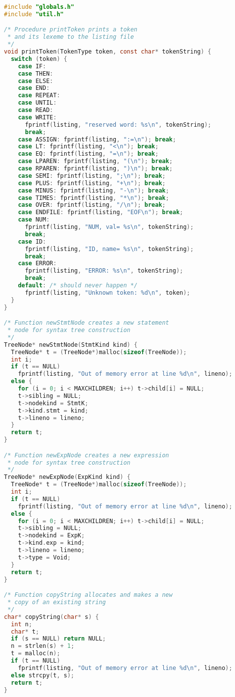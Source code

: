 \documentclass[lang=cn,10pt]{elegantbook}
\begin{document}
\begin{lstlisting}[caption={util.c},language=c]
#include "globals.h"
#include "util.h"

/* Procedure printToken prints a token 
 * and its lexeme to the listing file
 */
void printToken(TokenType token, const char* tokenString) {
  switch (token) {
    case IF:
    case THEN:
    case ELSE:
    case END:
    case REPEAT:
    case UNTIL:
    case READ:
    case WRITE:
      fprintf(listing, "reserved word: %s\n", tokenString);
      break;
    case ASSIGN: fprintf(listing, ":=\n"); break;
    case LT: fprintf(listing, "<\n"); break;
    case EQ: fprintf(listing, "=\n"); break;
    case LPAREN: fprintf(listing, "(\n"); break;
    case RPAREN: fprintf(listing, ")\n"); break;
    case SEMI: fprintf(listing, ";\n"); break;
    case PLUS: fprintf(listing, "+\n"); break;
    case MINUS: fprintf(listing, "-\n"); break;
    case TIMES: fprintf(listing, "*\n"); break;
    case OVER: fprintf(listing, "/\n"); break;
    case ENDFILE: fprintf(listing, "EOF\n"); break;
    case NUM:
      fprintf(listing, "NUM, val= %s\n", tokenString);
      break;
    case ID:
      fprintf(listing, "ID, name= %s\n", tokenString);
      break;
    case ERROR:
      fprintf(listing, "ERROR: %s\n", tokenString);
      break;
    default: /* should never happen */
      fprintf(listing, "Unknown token: %d\n", token);
  }
}

/* Function newStmtNode creates a new statement
 * node for syntax tree construction
 */
TreeNode* newStmtNode(StmtKind kind) {
  TreeNode* t = (TreeNode*)malloc(sizeof(TreeNode));
  int i;
  if (t == NULL)
    fprintf(listing, "Out of memory error at line %d\n", lineno);
  else {
    for (i = 0; i < MAXCHILDREN; i++) t->child[i] = NULL;
    t->sibling = NULL;
    t->nodekind = StmtK;
    t->kind.stmt = kind;
    t->lineno = lineno;
  }
  return t;
}

/* Function newExpNode creates a new expression 
 * node for syntax tree construction
 */
TreeNode* newExpNode(ExpKind kind) {
  TreeNode* t = (TreeNode*)malloc(sizeof(TreeNode));
  int i;
  if (t == NULL)
    fprintf(listing, "Out of memory error at line %d\n", lineno);
  else {
    for (i = 0; i < MAXCHILDREN; i++) t->child[i] = NULL;
    t->sibling = NULL;
    t->nodekind = ExpK;
    t->kind.exp = kind;
    t->lineno = lineno;
    t->type = Void;
  }
  return t;
}

/* Function copyString allocates and makes a new
 * copy of an existing string
 */
char* copyString(char* s) {
  int n;
  char* t;
  if (s == NULL) return NULL;
  n = strlen(s) + 1;
  t = malloc(n);
  if (t == NULL)
    fprintf(listing, "Out of memory error at line %d\n", lineno);
  else strcpy(t, s);
  return t;
}


\end{lstlisting}
\end{document}
